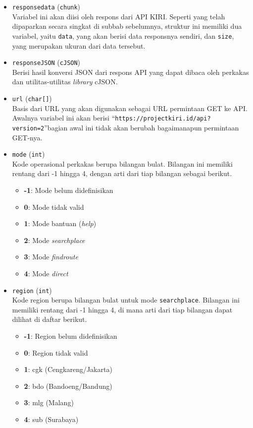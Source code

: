 \begin{itemize}
	\item \verb|responsedata| (\verb|chunk|) \\
	Variabel ini akan diisi oleh respons dari API KIRI. Seperti yang telah dipaparkan secara singkat di subbab sebelumnya, struktur ini memiliki dua variabel, yaitu \verb|data|, yang akan berisi data responsnya sendiri, dan \verb|size|, yang merupakan ukuran dari data tersebut.
	\item \verb|responseJSON| (\verb|cJSON|) \\
	Berisi hasil konversi JSON dari respons API yang dapat dibaca oleh perkakas dan utilitas-utilitas \textit{library} cJSON.
	\item \verb|url| (\verb|char[]|) \\
	Basis dari URL yang akan digunakan sebagai URL permintaan GET ke API. Awalnya variabel ini akan berisi ``\verb|https://projectkiri.id/api?version=2|''\textemdash bagian awal ini tidak akan berubah bagaimanapun permintaan GET-nya.
	\item \verb|mode| (\verb|int|) \\
	Kode operasional perkakas berupa bilangan bulat. Bilangan ini memiliki rentang dari -1 hingga 4, dengan arti dari tiap bilangan sebagai berikut.
	
	\begin{itemize}
		\item \textbf{-1}: Mode belum didefinisikan
		\item \textbf{0}: Mode tidak valid
		\item \textbf{1}: Mode bantuan (\textit{help})
		\item \textbf{2}: Mode \textit{searchplace}
		\item \textbf{3}: Mode \textit{findroute}
		\item \textbf{4}: Mode \textit{direct}
	\end{itemize}
	
	\item \verb|region| (\verb|int|) \\
	Kode region berupa bilangan bulat untuk mode \verb|searchplace|. Bilangan ini memiliki rentang dari -1 hingga 4, di mana arti dari tiap bilangan dapat dilihat di daftar berikut.
	
	\begin{itemize}
		\item \textbf{-1}: Region belum didefinisikan
		\item \textbf{0}: Region tidak valid
		\item \textbf{1}: cgk (Cengkareng/Jakarta)
		\item \textbf{2}: bdo (Bandoeng/Bandung)
		\item \textbf{3}: mlg (Malang)
		\item \textbf{4}: sub (Surabaya)
	\end{itemize}
	

\end{itemize}
